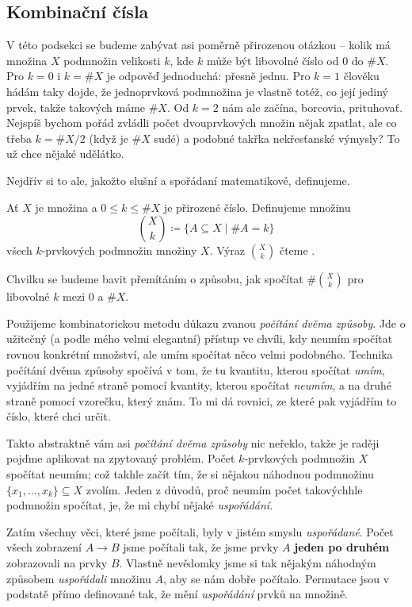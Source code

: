 \subsection{Kombinační čísla}
\label{ssec:kombinacni-cisla}

V této podsekci se budeme zabývat asi poměrně přirozenou otázkou -- kolik má
množina $X$ podmnožin velikosti $k$, kde $k$ může být libovolné číslo od $0$ do
$\# X$. Pro $k=0$ i $k=\# X$ je odpověď jednoduchá: přesně jednu. Pro $k = 1$
člověku hádám taky dojde, že jednoprvková podmnožina je vlastně totéž, co její
jediný prvek, takže takových máme $\# X$. Od $k = 2$ nám ale začína, borcovia,
prituhovať. Nejspíš bychom pořád zvládli počet dvouprvkových množin nějak
zpatlat, ale co třeba $k = \# X / 2$ (když je $\# X$ sudé) a podobné takřka
nekřesťanské výmysly? To už chce nějaké udělátko.

Nejdřív si to ale, jakožto slušní a spořádaní matematikové, definujeme.

\begin{definition}
 Ať $X$ je množina a $0 \leq k \leq \# X$ je přirozené číslo. Definujeme množinu
 \[
  \binom{X}{k} \coloneqq \{A \subseteq X \mid \# A = k\}
 \]
 všech $k$-prvkových podmnožin množiny $X$. Výraz $\binom{X}{k}$ čteme .
\end{definition}

Chvilku se budeme bavit přemítáním o způsobu, jak spočítat $\# \binom{X}{k}$ pro
libovolné $k$ mezi $0$ a $\# X$.

Použijeme kombinatorickou metodu důkazu zvanou \emph{počítání dvěma způsoby}.
Jde o užitečný (a podle mého velmi elegantní) přístup ve chvíli, kdy neumím
spočítat rovnou konkrétní množství, ale umím spočítat něco vel\-mi podobného.
Technika počítání dvěma způsoby spočívá v tom, že tu kvantitu, kterou spočítat
\emph{umím}, vyjádřím na jedné straně pomocí kvantity, kterou spočítat
\emph{neumím}, a na druhé straně pomocí vzorečku, který znám. To mi dá rovnici,
ze které pak vyjádřím to číslo, které chci určit.

Takto abstraktně vám asi \emph{počítání dvěma způsoby} nic neřeklo, takže je
raději pojďme aplikovat na zpytovaný problém. Počet $k$-prvkových podmnožin $X$
spočítat neumím; což takhle začít tím, že si nějakou náhodnou podmnožinu
$\{x_1,\ldots,x_k\} \subseteq X$ zvolím. Jeden z důvodů, proč neumím počet
takovýchhle podmnožin spočítat, je, že mi chybí nějaké \emph{uspořádání}.

Zatím všechny věci, které jsme počítali, byly v jistém smyslu \emph{uspořádané}.
Počet všech zobrazení $A \to B$ jsme počítali tak, že jsme prvky $A$
\textbf{jeden po druhém} zobrazovali na prvky $B$. Vlastně nevědomky jsme si tak
nějakým náhodným způsobem \emph{uspořádali} množinu $A$, aby se nám dobře
počítalo. Permutace jsou v podstatě přímo definované tak, že mění
\emph{uspořádání} prvků na množině.


